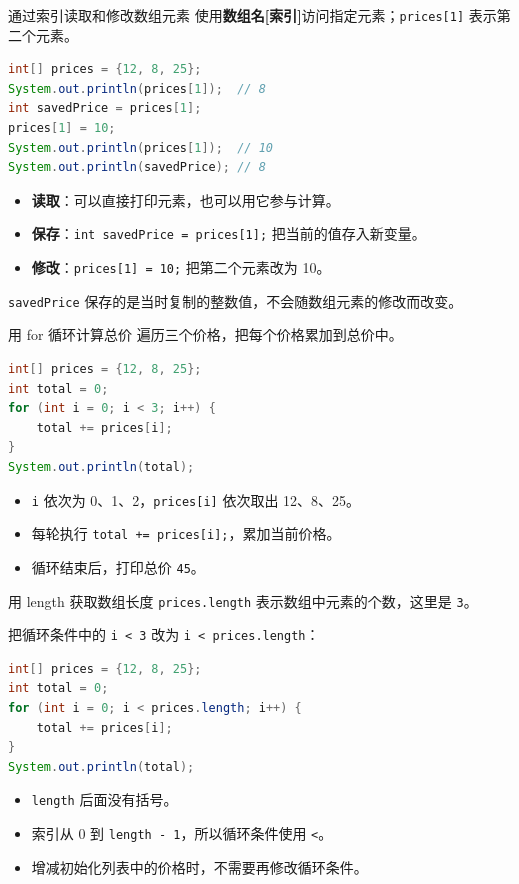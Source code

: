 \documentclass[aspectratio=169]{beamer}
\begin{document}
\begin{frame}[fragile]{通过索引读取和修改数组元素}
  使用\textbf{数组名[索引]}访问指定元素；\texttt{prices[1]} 表示第二个元素。
  \par\medskip
  \begin{lstlisting}[language=Java]
int[] prices = {12, 8, 25};
System.out.println(prices[1]);  // 8
int savedPrice = prices[1];
prices[1] = 10;
System.out.println(prices[1]);  // 10
System.out.println(savedPrice); // 8
  \end{lstlisting}
  \begin{itemize}
    \item \textbf{读取}：可以直接打印元素，也可以用它参与计算。
    \item \textbf{保存}：\texttt{int savedPrice = prices[1];} 把当前的值存入新变量。
    \item \textbf{修改}：\texttt{prices[1] = 10;} 把第二个元素改为 10。
  \end{itemize}
  \medskip
  \texttt{savedPrice} 保存的是当时复制的整数值，\alert{不会随数组元素的修改而改变}。
\end{frame}

\begin{frame}[fragile]{用 for 循环计算总价}
  遍历三个价格，把每个价格累加到总价中。
  \begin{lstlisting}[language=Java]
int[] prices = {12, 8, 25};
int total = 0;
for (int i = 0; i < 3; i++) {
    total += prices[i];
}
System.out.println(total);
  \end{lstlisting}
  \begin{itemize}
    \item \texttt{i} 依次为 0、1、2，\texttt{prices[i]} 依次取出 12、8、25。
    \item 每轮执行 \texttt{total += prices[i];}，累加当前价格。
    \item 循环结束后，打印总价 \texttt{45}。
  \end{itemize}
\end{frame}

\begin{frame}[fragile]{用 length 获取数组长度}
  \texttt{prices.length} 表示数组中元素的个数，这里是 \texttt{3}。
  \par\medskip
  把循环条件中的 \texttt{i < 3} 改为 \texttt{i < prices.length}：
  \begin{lstlisting}[language=Java]
int[] prices = {12, 8, 25};
int total = 0;
for (int i = 0; i < prices.length; i++) {
    total += prices[i];
}
System.out.println(total);
  \end{lstlisting}
  \begin{itemize}
    \item \texttt{length} 后面没有括号。
    \item 索引从 0 到 \texttt{length - 1}，所以循环条件使用 \texttt{<}。
    \item 增减初始化列表中的价格时，不需要再修改循环条件。
  \end{itemize}
\end{frame}
\end{document}
